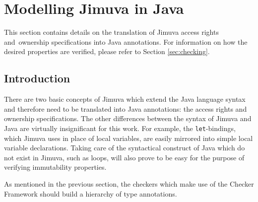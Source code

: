 \documentclass{pracamgr}
\newcommand{\todo}[1]{}
\begin{document}
\section{Modelling Jimuva in Java}
\label{sec:modelling}

This section contains details on the translation of Jimuva access
rights and~ownership specifications into Java annotations. For
information on how the desired properties are verified, please refer
to Section \ref{sec:checking}.

\subsection{Introduction}

There are two basic concepts of Jimuva which extend the Java language
syntax and therefore need to be translated into Java annotations: the
access rights and ownership specifications. The other differences
between the syntax of Jimuva and Java are virtually insignificant for
this work. For example, the \texttt{let}-bindings, which Jimuva uses
in place of local variables, are easily mirrored into simple local
variable declarations. Taking care of the syntactical construct of
Java which do not exist in Jimuva, such as loops, will also prove to
be easy for the purpose of verifying immutability properties.

As mentioned in the previous section, \todo{check if it is previous}
the checkers which make use of the Checker Framework should build a
hierarchy of type annotations. 




{}

\end{document}
